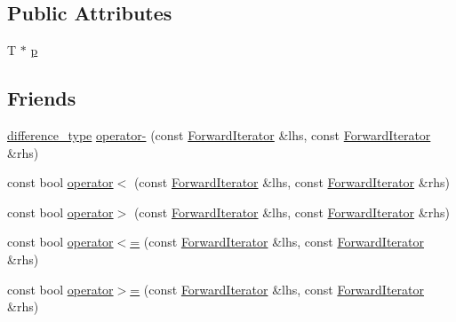 \subsection*{Public Attributes}
\begin{DoxyCompactItemize}
\item 
T $\ast$ \hyperlink{classprism_1_1containers_1_1_forward_iterator_afae3bf32acc98ab535b9bdb8156ba58f}{p}
\end{DoxyCompactItemize}
\subsection*{Friends}
\begin{DoxyCompactItemize}
\item 
\hyperlink{classprism_1_1containers_1_1_forward_iterator_a79680986bd39e3c2f0ab1e008b1150e5}{difference\+\_\+type} \hyperlink{classprism_1_1containers_1_1_forward_iterator_aaad8cb3873bc75101e6aec86fda597b0}{operator-\/} (const \hyperlink{classprism_1_1containers_1_1_forward_iterator}{Forward\+Iterator} \&lhs, const \hyperlink{classprism_1_1containers_1_1_forward_iterator}{Forward\+Iterator} \&rhs)
\item 
const bool \hyperlink{classprism_1_1containers_1_1_forward_iterator_a6b30659c53f42b141d66d983aa919acd}{operator$<$} (const \hyperlink{classprism_1_1containers_1_1_forward_iterator}{Forward\+Iterator} \&lhs, const \hyperlink{classprism_1_1containers_1_1_forward_iterator}{Forward\+Iterator} \&rhs)
\item 
const bool \hyperlink{classprism_1_1containers_1_1_forward_iterator_a99354852714dd199e60ce045023c2573}{operator$>$} (const \hyperlink{classprism_1_1containers_1_1_forward_iterator}{Forward\+Iterator} \&lhs, const \hyperlink{classprism_1_1containers_1_1_forward_iterator}{Forward\+Iterator} \&rhs)
\item 
const bool \hyperlink{classprism_1_1containers_1_1_forward_iterator_a0587c766ccabd72167e87461c8637cc1}{operator$<$=} (const \hyperlink{classprism_1_1containers_1_1_forward_iterator}{Forward\+Iterator} \&lhs, const \hyperlink{classprism_1_1containers_1_1_forward_iterator}{Forward\+Iterator} \&rhs)
\item 
const bool \hyperlink{classprism_1_1containers_1_1_forward_iterator_ab9192c8005124b4eee6a698a74d71e01}{operator$>$=} (const \hyperlink{classprism_1_1containers_1_1_forward_iterator}{Forward\+Iterator} \&lhs, const \hyperlink{classprism_1_1containers_1_1_forward_iterator}{Forward\+Iterator} \&rhs)
\end{DoxyCompactItemize}


